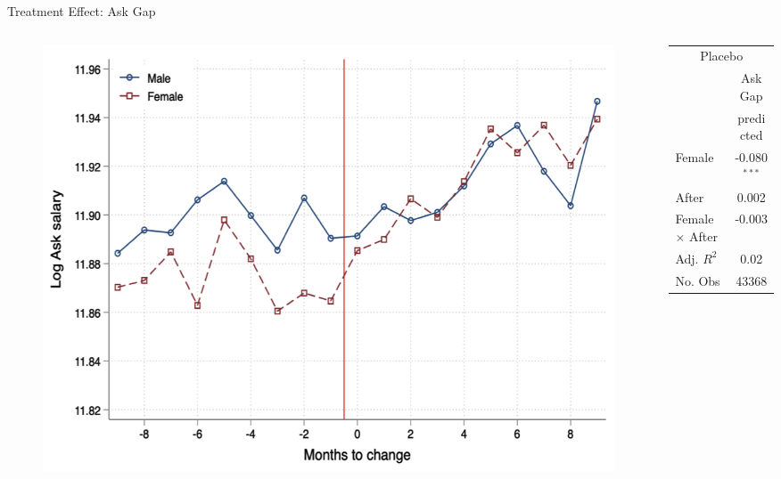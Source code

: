 \begin{frame}{Treatment Effect: Ask Gap}
    \begin{columns}
        \begin{column}{0.6\textwidth}
            \begin{figure}
                \centering
                \includegraphics[width = 0.9 \textwidth]{images/treat_ask.png}
            \end{figure}
        \end{column}

        \begin{column}{0.4\textwidth}
            \begin{table}[h!]
                \scriptsize
                \begin{center}
                    \begin{tabular}{lc}
                        \multicolumn{2}{c}{Placebo} \\
                         & Ask Gap  \\
                         & predicted \\ \hline
                        Female & -0.080$^{***}$ \\
                        After & 0.002 \\
                        Female $\times$ After & -0.003\\
                        \hline 
                        Adj. $R^2$ & 0.02  \\
                        No. Obs & 43368
                    \end{tabular}
                \end{center}
            \end{table}
        \end{column}
    \end{columns}
\end{frame}

